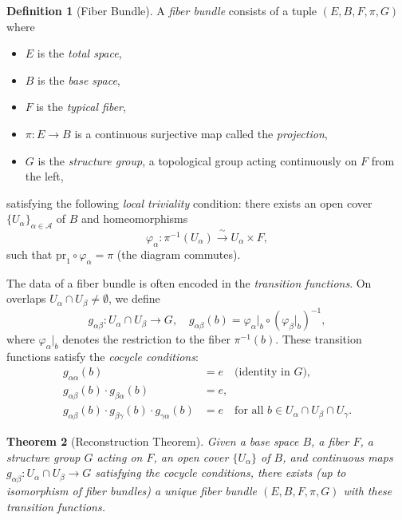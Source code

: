 \documentclass[12pt,a4paper]{amsart}
\newtheorem{theorem}{Theorem}[section]
\theoremstyle{definition}
\newtheorem{definition}[theorem]{Definition}
\begin{document}
\begin{definition}[Fiber Bundle]
A \textit{fiber bundle} consists of a tuple $(E, B, F, \pi, G)$ where
\begin{itemize}[noitemsep]
  \item $E$ is the \emph{total space},
  \item $B$ is the \emph{base space},
  \item $F$ is the \emph{typical fiber},
  \item $\pi \colon E \to B$ is a continuous surjective map called the
        \emph{projection},
  \item $G$ is the \emph{structure group}, a topological group acting
        continuously on $F$ from the left,
\end{itemize}
satisfying the following \emph{local triviality} condition: there exists an
open cover $\{U_\alpha\}_{\alpha \in \mathcal{A}}$ of $B$ and homeomorphisms
\[
  \varphi_\alpha \colon \pi^{-1}(U_\alpha) \xrightarrow{\;\sim\;} U_\alpha \times F,
\]
such that $\mathrm{pr}_1 \circ \varphi_\alpha = \pi$ (the diagram commutes).
\end{definition}

The data of a fiber bundle is often encoded in the \textit{transition functions}.
On overlaps $U_\alpha \cap U_\beta \neq \emptyset$, we define
\[
  g_{\alpha\beta} \colon U_\alpha \cap U_\beta \to G, \quad
  g_{\alpha\beta}(b) = \varphi_\alpha|_b \circ (\varphi_\beta|_b)^{-1},
\]
where $\varphi_\alpha|_b$ denotes the restriction to the fiber $\pi^{-1}(b)$.
These transition functions satisfy the \emph{cocycle conditions}:
\begin{align*}
  g_{\alpha\alpha}(b) &= e \quad \text{(identity in } G\text{)},\\
  g_{\alpha\beta}(b) \cdot g_{\beta\alpha}(b) &= e,\\
  g_{\alpha\beta}(b) \cdot g_{\beta\gamma}(b) \cdot g_{\gamma\alpha}(b) &= e
  \quad \text{for all } b \in U_\alpha \cap U_\beta \cap U_\gamma.
\end{align*}

\begin{theorem}[Reconstruction Theorem]
\label{thm:reconstruction}
Given a base space $B$, a fiber $F$, a structure group $G$ acting on $F$, an
open cover $\{U_\alpha\}$ of $B$, and continuous maps $g_{\alpha\beta} \colon
U_\alpha \cap U_\beta \to G$ satisfying the cocycle conditions, there exists
(up to isomorphism of fiber bundles) a unique fiber bundle $(E, B, F, \pi, G)$
with these transition functions.
\end{theorem}
\end{document}
